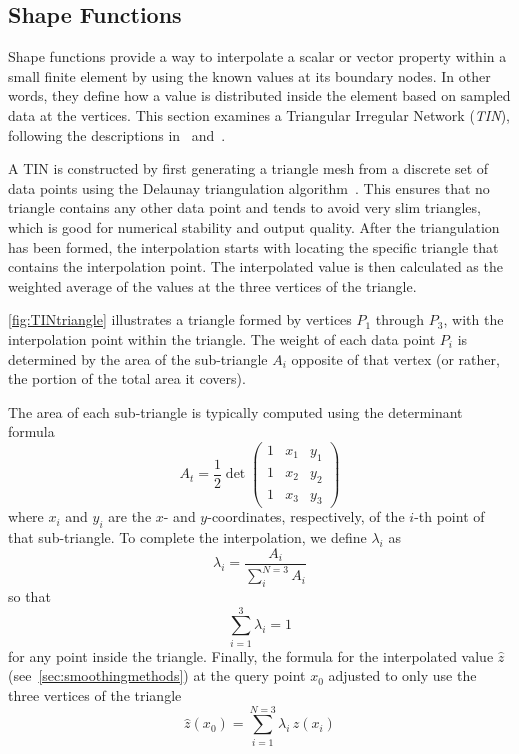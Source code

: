 \subsection{Shape Functions}\label{subsec:shape_functions}

Shape functions provide a way to interpolate a scalar or vector property within a small finite element by using the known values at its boundary nodes. In other words, they define how a value is distributed inside the element based on sampled data at the vertices. This section examines a Triangular Irregular Network (\emph{TIN}), following the descriptions in\ \cite{shape:book01} and\ \cite{shape:book02}.

A TIN is constructed by first generating a triangle mesh from a discrete set of data points using the Delaunay triangulation algorithm\ \cite{shape:triangles}. This ensures that no triangle contains any other data point and tends to avoid very slim triangles, which is good for numerical stability and output quality. After the triangulation has been formed, the interpolation starts with locating the specific triangle that contains the interpolation point. The interpolated value is then calculated as the weighted average of the values at the three vertices of the triangle.


\autoref{fig:TINtriangle} illustrates a triangle formed by vertices $P_1$ through $P_3$, with the interpolation point within the triangle. The weight of each data point $P_i$ is determined by the area of the sub-triangle $A_i$ opposite of that vertex (or rather, the portion of the total area it covers).

The area of each sub-triangle is typically computed using the determinant formula
\[
A_t=\frac{1}{2}\det
\left(\begin{matrix}
    1 & x_1 & y_1\\
    1 & x_2 & y_2\\
    1 & x_3 & y_3
\end{matrix}\right)
\]
where $x_i$ and $y_i$ are the $x$- and $y$-coordinates, respectively, of the $i$-th point of that sub-triangle. To complete the interpolation, we define $\lambda_i$ as
\[
\lambda_i=\frac{A_i}{\sum_i^{N=3}A_i}
\]
so that
\[
\sum_{i=1}^{3}\lambda_i = 1
\]
for any point inside the triangle. Finally, the formula for the interpolated value $\hat{z}$ (see\ \autoref{sec:smoothingmethods}) at the query point $x_0$ adjusted to only use the three vertices of the triangle
\[
\hat{z}(x_0)=\sum_{i=1}^{N=3} \lambda_i\, z(x_i)
\]
\nolinebreak\cite{mdpi:01}

